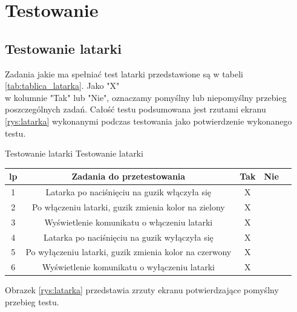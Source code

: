 	\newpage
\section{Testowanie}	%


\subsection{Testowanie latarki}

Zadania jakie ma spełniać test latarki przedstawione są w tabeli \ref{tab:tablica_latarka}. Jako "X" \\ w kolumnie "Tak" lub "Nie", oznaczamy pomyślny lub niepomyślny przebieg poszczególnych zadań. Całość testu podsumowana jest rzutami ekranu \ref{rys:latarka} wykonanymi podczas testowania jako potwierdzenie wykonanego testu.

\begin{tabela}
	{Testowanie latarki}	%
	{Testowanie latarki}	%
	{
		\begin{tabular}{|c|c|c|c|c|} \hline
			\textbf{lp} & \textbf{Zadania do przetestowania} & \textbf{Tak} & \textbf{Nie} \\ \hline
			1 & Latarka po naciśnięciu na guzik włączyła się & X & ~ \\ \hline
			2 & Po włączeniu latarki, guzik zmienia kolor na zielony & X & ~ \\ \hline
			3 & Wyświetlenie komunikatu o włączeniu latarki & X & ~ \\ \hline
			4 & Latarka po naciśnięciu na guzik wyłączyła się & X & ~ \\ \hline
			5 & Po wyłączeniu latarki, guzik zmienia kolor na czerwony & X & ~ \\ \hline
			6 & Wyświetlenie komunikatu o wyłączeniu latarki & X & ~ \\ \hline
		\end{tabular}	}
	\label{tab:tablica_latarka}
\end{tabela}

Obrazek \ref{rys:latarka} przedstawia zrzuty ekranu potwierdzające pomyślny przebieg testu.

